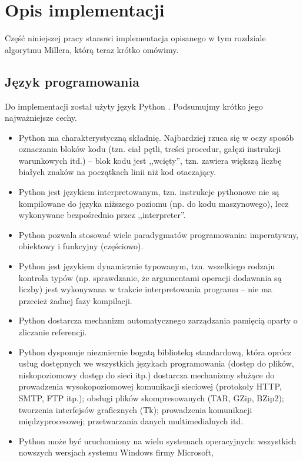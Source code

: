 \section{Opis implementacji}

Część niniejszej pracy stanowi implementacja
opisanego w tym rozdziale algorytmu Millera,
którą teraz krótko omówimy.

\subsection*{Język programowania}

Do implementacji został użyty język Python \cite{python}.
Podsumujmy krótko jego najważniejsze cechy.
\begin{itemize}
\item
Python ma charakterystyczną składnię.
Najbardziej rzuca się w oczy sposób oznaczania bloków kodu
(tzn. ciał pętli, treści procedur, gałęzi instrukcji warunkowych itd.) --
blok kodu jest ,,wcięty'',
tzn. zawiera większą liczbę białych znaków na początkach linii
niż kod otaczający.
\item
Python jest językiem interpretowanym,
tzn. instrukcje pythonowe nie są kompilowane do języka niższego poziomu
(np. do kodu maszynowego),
lecz wykonywane bezpośrednio przez ,,interpreter''.
\item
Python pozwala stosować wiele paradygmatów programowania:
imperatywny, obiektowy i funkcyjny (częściowo).
\item
Python jest językiem dynamicznie typowanym,
tzn. wszelkiego rodzaju kontrola typów
(np. sprawdzanie, że argumentami operacji dodawania są liczby)
jest wykonywana w trakcie interpretowania programu --
nie ma przecież żadnej fazy kompilacji.
\item
Python dostarcza mechanizm automatycznego zarządzania pamięcią
oparty o zliczanie referencji.
\item
Python dysponuje niezmiernie bogatą biblioteką standardową,
która oprócz usług dostępnych we wszystkich językach programowania
(dostęp do plików, niskopoziomowy dostęp do sieci itp.)
dostarcza mechanizmy służące
do prowadzenia wysokopoziomowej komunikacji sieciowej
(protokoły HTTP, SMTP, FTP itp.);
obsługi plików skompresowanych (TAR, GZip, BZip2);
tworzenia interfejsów graficznych (Tk);
prowadzenia komunikacji międzyprocesowej;
przetwarzania danych multimedialnych itd.
\item
Python może być uruchomiony na wielu systemach operacyjnych:
wszystkich nowszych wersjach systemu Windows firmy Microsoft,

\end{itemize}
